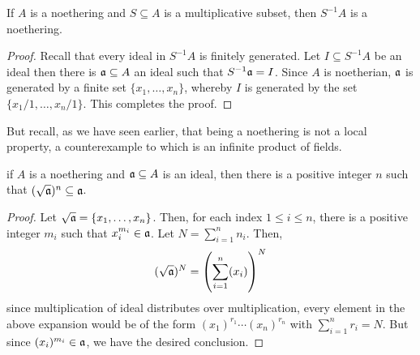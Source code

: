 \begin{proposition}
    If $A$ is a noethering and $S\subseteq A$ is a multiplicative subset, then $S^{-1}A$ is a noethering.
\end{proposition}
\begin{proof}
    Recall that every ideal in $S^{-1}A$ is finitely generated. Let $I\subseteq S^{-1}A$ be an ideal then there is $\mathfrak a\subseteq A$ an ideal such that $S^{-1}\mathfrak a = I$. Since $A$ is noetherian, $\mathfrak a$ is generated by a finite set $\{x_1,\ldots,x_n\}$, whereby $I$ is generated by the set $\{x_1/1,\ldots,x_n/1\}$. This completes the proof.
\end{proof}

But recall, as we have seen earlier, that being a noethering is not a local property, a counterexample to which is an infinite product of fields.

\begin{lemma}
    if $A$ is a noethering and $\mathfrak a\subseteq A$ is an ideal, then there is a positive integer $n$ such that $(\sqrt{\mathfrak a})^n\subseteq\mathfrak a$.
\end{lemma}
\begin{proof}
    Let $\sqrt{\mathfrak a} = \{x_1,\ldots,x_n\}$. Then, for each index $1\le i\le n$, there is a positive integer $m_i$ such that $x_i^{m_i}\in\mathfrak a$. Let $N = \sum_{i = 1}^n n_i$. Then,
    \begin{equation*}
        (\sqrt{\mathfrak a})^N = \left(\sum_{i = 1}^n(x_i)\right)^N
    \end{equation*}
    since multiplication of ideal distributes over multiplication, every element in the above expansion would be of the form $(x_1)^{r_1}\cdots(x_n)^{r_n}$ with $\sum_{i = 1}^n r_i = N$. But since $(x_i)^{m_i}\in\mathfrak a$, we have the desired conclusion.
\end{proof}

